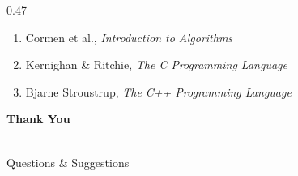 \documentclass[aspectratio=169,10pt]{beamer}
\begin{document}
\begin{frame}
\begin{columns}[T]
\begin{column}{0.47\textwidth}
\begin{enumerate}
\item Cormen et al.,
\textit{Introduction to Algorithms}

\item Kernighan \& Ritchie,
\textit{The C Programming Language}

\item Bjarne Stroustrup,
\textit{The C++ Programming Language}

\end{enumerate}

\vfill

\begin{center}

\colorbox{GEUBlue}{
\parbox{0.75\textwidth}{
\centering

\color{white}

\textbf{Thank You}

\\[1mm]

Questions \& Suggestions

}}

\end{center}

\end{column}

\end{columns}

\end{frame}


\end{document}
